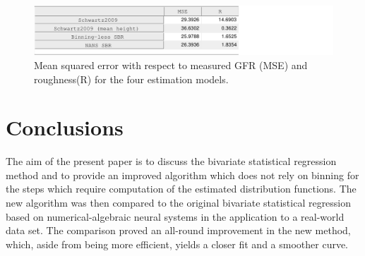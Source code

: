\documentclass[10pt,final]{siamltex}
\begin{document}
\begin{figure}[ht]
  \centering
  \includegraphics[scale=0.6]{figures/table}
  \caption{Mean squared error with respect to measured GFR (MSE) and roughness(R) for the four estimation models. }
  \label{table}
\end{figure}

\section{Conclusions}\label{conclusion}
%
The aim of the present paper is to discuss the bivariate statistical regression method and to provide an improved algorithm which does not rely on binning for the steps which require computation of the estimated distribution functions. The new algorithm was then compared to the original bivariate statistical regression based on numerical-algebraic neural systems in the application to a real-world data set. The comparison proved an all-round improvement in the new method, which, aside from being more efficient, yields a closer fit and a smoother curve.
%
\end{document}
